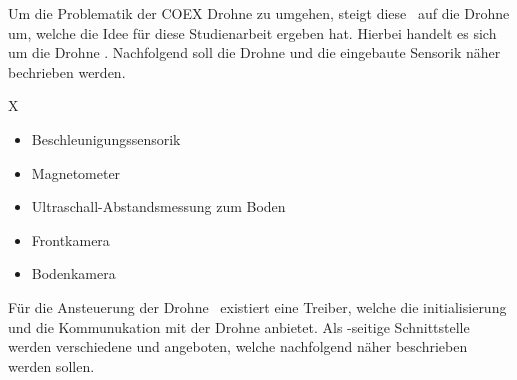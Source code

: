 
Um die Problematik der COEX Drohne zu umgehen, steigt diese \Arbeit\ auf die Drohne um, welche die Idee für diese Studienarbeit ergeben hat.
Hierbei handelt es sich um die Drohne \Ar. Nachfolgend soll die Drohne und die eingebaute Sensorik näher bechrieben werden.







X





















\begin{itemize}
\item Beschleunigungssensorik
\item Magnetometer
\item Ultraschall-Abstandsmessung zum Boden
\item Frontkamera
\item Bodenkamera
\end{itemize}










Für die Ansteuerung der Drohne \Ar\ existiert eine Treiber, welche die initialisierung und die Kommunukation mit der Drohne anbietet. Als \ROS-seitige Schnittstelle werden verschiedene \Topic[s] und \Service[s] angeboten, welche nachfolgend näher beschrieben werden sollen.





























